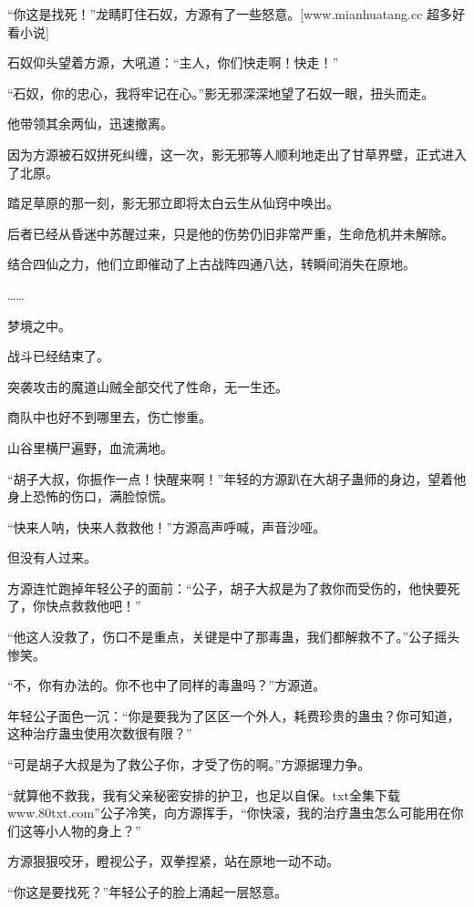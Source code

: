 
\begin{this_body}

“你这是找死！”龙睛盯住石奴，方源有了一些怒意。[www.mianhuatang.cc 超多好看小说]

石奴仰头望着方源，大吼道：“主人，你们快走啊！快走！”

“石奴，你的忠心，我将牢记在心。”影无邪深深地望了石奴一眼，扭头而走。

他带领其余两仙，迅速撤离。

因为方源被石奴拼死纠缠，这一次，影无邪等人顺利地走出了甘草界壁，正式进入了北原。

踏足草原的那一刻，影无邪立即将太白云生从仙窍中唤出。

后者已经从昏迷中苏醒过来，只是他的伤势仍旧非常严重，生命危机并未解除。

结合四仙之力，他们立即催动了上古战阵四通八达，转瞬间消失在原地。

……

梦境之中。

战斗已经结束了。

突袭攻击的魔道山贼全部交代了性命，无一生还。

商队中也好不到哪里去，伤亡惨重。

山谷里横尸遍野，血流满地。

“胡子大叔，你振作一点！快醒来啊！”年轻的方源趴在大胡子蛊师的身边，望着他身上恐怖的伤口，满脸惊慌。

“快来人呐，快来人救救他！”方源高声呼喊，声音沙哑。

但没有人过来。

方源连忙跑掉年轻公子的面前：“公子，胡子大叔是为了救你而受伤的，他快要死了，你快点救救他吧！”

“他这人没救了，伤口不是重点，关键是中了那毒蛊，我们都解救不了。”公子摇头惨笑。

“不，你有办法的。你不也中了同样的毒蛊吗？”方源道。

年轻公子面色一沉：“你是要我为了区区一个外人，耗费珍贵的蛊虫？你可知道，这种治疗蛊虫使用次数很有限？”

“可是胡子大叔是为了救公子你，才受了伤的啊。”方源据理力争。

“就算他不救我，我有父亲秘密安排的护卫，也足以自保。txt全集下载www.80txt.com”公子冷笑，向方源挥手，“你快滚，我的治疗蛊虫怎么可能用在你们这等小人物的身上？”

方源狠狠咬牙，瞪视公子，双拳捏紧，站在原地一动不动。

“你这是要找死？”年轻公子的脸上涌起一层怒意。


\end{this_body}
